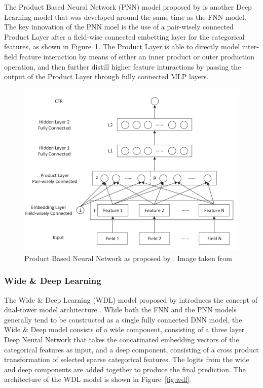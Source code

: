 \documentclass{mldsmsc}
\begin{document}
The Product Based Neural Network (PNN) model
proposed by \cite{RefWorks:qu2016product-based} is another Deep Learning
model that was developed around the same time as the FNN model. The key 
innovation of the PNN moel is the use of a pair-wisely connected Product Layer
after a field-wise connected embetting layer for the categorical features, as shown
in Figure~\ref{fig:pnn}. The Product Layer is able to directly model inter-field feature
interaction by means of either an inner product or outer production operation, and then further
distill higher feature inturactions by passing the output of the Product Layer through fully
connected MLP layers.


\begin{figure}[h]
\centering
\includegraphics[]{../figures/pnn.png}
\caption{Product Based Neural Network as proposed by \cite{RefWorks:qu2016product-based}. Image taken from \cite{RefWorks:shen2017deepctr:}}
\label{fig:pnn}
\end{figure}


\subsubsection{Wide \& Deep Learning}

The Wide \& Deep Learning (WDL) model proposed by \cite{RefWorks:cheng2016wide} introduces the concept
of dual-tower model architecture \citep{RefWorks:zhang2021deep}. While both the FNN and the PNN models
generally tend to be constructed as a single fully connected DNN model, the Wide \& Deep model
consists of a wide component, consisting of a three layer Deep Neural Network that takes the concatinated
embedding vectors of the categorical features as input, and a deep component, consisting of a cross product
transformation of selected sparse categorical features. The logits from the wide and deep components are added
together to produce the final prediction. The architecture of the WDL model is shown in Figure~\ref{fig:wdl}.
\end{document}
